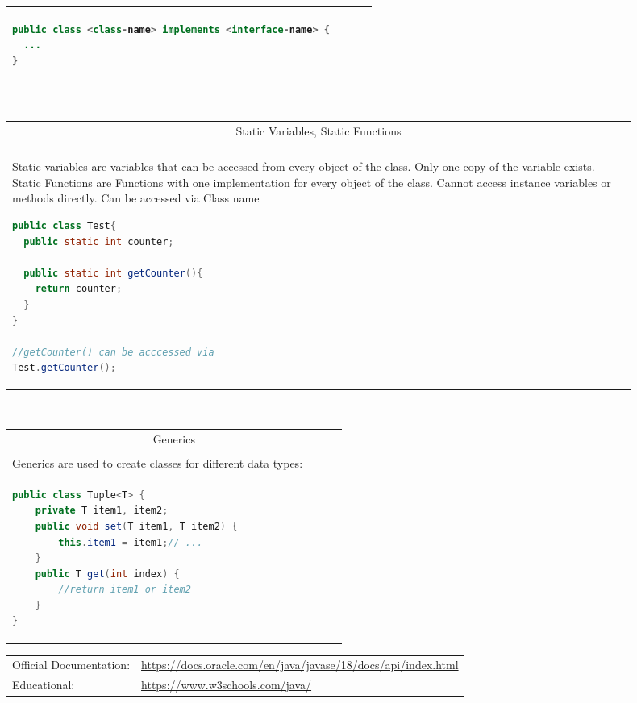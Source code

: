 \documentclass[a4paper, 8pt]{extarticle}
\begin{document}
\begin{minipage}[t]{0.25\linewidth}
\begin{tabular}{|p{0.9\linewidth}|}
\begin{lstlisting}[language=Java, aboveskip=0pt,belowskip=2pt]
public class <class-name> implements <interface-name> {
  ...
}\end{lstlisting}
\\[3pt]\hline
\end{tabular}
\\[3pt]
\begin{tabular}{|p{0.9\linewidth}|}
\multicolumn{1}{|c|}{\cellcolor{headcol}\color{white}Static Variables, Static Functions}\\
\\[-7pt]
Static variables are variables that can be accessed from every object of the class. Only one copy of the variable exists.
Static Functions are Functions with one implementation for every object of the class. Cannot access instance variables or methods directly.
Can be accessed via Class name
\begin{lstlisting}[language=Java, aboveskip=0pt,belowskip=-7pt]
public class Test{
  public static int counter;

  public static int getCounter(){
    return counter;
  }
}

//getCounter() can be acccessed via
Test.getCounter();\end{lstlisting}
\\[3pt]\hline
\end{tabular}
\\[3pt]
\begin{tabular}{|p{0.9\linewidth}|}
\multicolumn{1}{|c|}{\cellcolor{headcol}\color{white}Generics}\\
\\[-7pt]
Generics are used to create classes
for different data types:
\\[-3pt]
\begin{lstlisting}[language=Java, aboveskip=-2pt,belowskip=-6pt]
  public class Tuple<T> {
    private T item1, item2;
    public void set(T item1, T item2) {
        this.item1 = item1;// ...
    }
    public T get(int index) {
        //return item1 or item2
    }
}
\end{lstlisting}
\\
\hline
\end{tabular}
\end{minipage}
\vspace{\fill}
\fontsize{10}{9}\selectfont
\begin{tabular}{ll}
Official Documentation: & \url{https://docs.oracle.com/en/java/javase/18/docs/api/index.html}\\

Educational: & \url{https://www.w3schools.com/java/}
\end{tabular}
\end{document}
